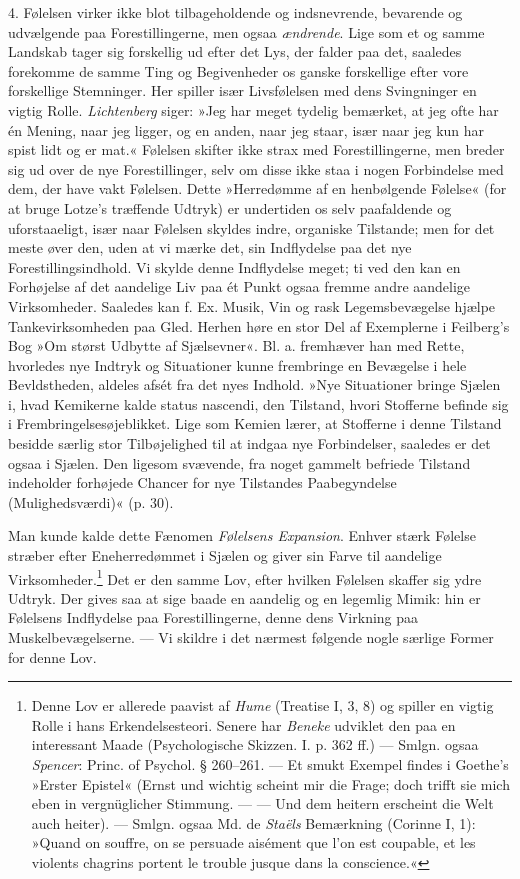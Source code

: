 \documentclass[12pt,a4paper,openany]{book}
\newcommand{\opage}[1]{\marginnote{\footnotesize\textit{[#1]}}}
\begin{document}
4. Følelsen virker ikke blot tilbageholdende og indsnevrende, bevarende
og udvælgende paa Forestillingerne, men ogsaa \emph{ændrende}. Lige som
et og samme Landskab tager sig forskellig ud efter det Lys, der falder
paa det, saaledes forekomme de samme Ting og Begivenheder os ganske
forskellige efter vore forskellige Stemninger. Her spiller især
Livsfølelsen med dens Svingninger en vigtig Rolle. \emph{Lichtenberg}
siger: »Jeg har meget tydelig bemærket, at jeg ofte har én Mening, naar
jeg ligger, og en anden, naar jeg staar, især naar jeg kun har spist
lidt og er mat.« Følelsen skifter ikke strax med Forestillingerne, men
breder sig ud over de nye Forestillinger, selv om disse ikke staa i
nogen Forbindelse med dem, der have vakt Følelsen. Dette »Herredømme af
en henbølgende Følelse« (for at bruge Lotze’s træffende Udtryk) er
undertiden os selv paafaldende og uforstaaeligt, især naar Følelsen
skyldes indre, organiske Tilstande; men for det meste øver den, uden at
vi mærke det, sin Indflydelse paa det nye Forestillingsindhold. Vi
skylde denne Indflydelse meget; ti ved den kan en Forhøjelse af det
aandelige Liv paa ét Punkt ogsaa fremme andre aandelige Virksomheder.
Saaledes kan f. Ex. Musik, Vin og rask Legemsbevægelse hjælpe
Tankevirksomheden paa Gled. Herhen høre en stor Del af Exemplerne i
Feilberg’s Bog »Om størst Udbytte af Sjælsevner«. Bl. a.
\opage{358}fremhæver han med Rette, hvorledes nye Indtryk og Situationer
kunne frembringe en Bevægelse i hele Bevldstheden, aldeles afsét fra det
nyes Indhold. »Nye Situationer bringe Sjælen i, hvad Kemikerne kalde
status nascendi, den Tilstand, hvori Stofferne befinde sig i
Frembringelsesøjeblikket. Lige som Kemien lærer, at Stofferne i denne
Tilstand besidde særlig stor Tilbøjelighed til at indgaa nye
Forbindelser, saaledes er det ogsaa i Sjælen. Den ligesom svævende, fra
noget gammelt befriede Tilstand indeholder forhøjede Chancer for nye
Tilstandes Paabegyndelse (Mulighedsværdi)« (p. 30).

Man kunde kalde dette Fænomen \emph{Følelsens Expansion}. Enhver stærk
Følelse stræber efter Eneherredømmet i Sjælen og giver sin Farve til
aandelige Virksomheder.\footnote[1]{Denne Lov er allerede paavist af
\emph{Hume} (Treatise I, 3, 8) og spiller en vigtig Rolle i hans
Erkendelsesteori. Senere har \emph{Beneke} udviklet den paa en
interessant Maade (Psychologische Skizzen. I. p. 362 ff.) --- Smlgn.
ogsaa \emph{Spencer}: Princ. of Psychol. § 260--261. --- Et smukt Exempel
findes i Goethe’s »Erster Epistel« (Ernst und wichtig scheint mir die
Frage; doch trifft sie mich eben in vergnüglicher Stimmung. --- --- Und
dem heitern erscheint die Welt auch heiter). --- Smlgn. ogsaa Md. de
\emph{Staëls} Bemærkning (Corinne I, 1): »Quand on souffre, on se
persuade aisément que l’on est coupable, et les violents chagrins
portent le trouble jusque dans la conscience.«} Det er den samme Lov,
efter hvilken Følelsen skaffer sig ydre Udtryk. Der gives saa at sige
baade en aandelig og en legemlig Mimik: hin er Følelsens Indflydelse paa
Forestillingerne, denne dens Virkning paa Muskelbevægelserne. --- Vi
skildre i det nærmest følgende nogle særlige Former for denne Lov.
\end{document}
